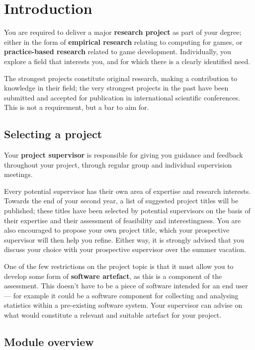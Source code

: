 \chapter{Introduction}

You are required to deliver a major \textbf{research project} as part of your degree;
either in the form of \textbf{empirical research} relating to computing for games,
or \textbf{practice-based research} related to game development.
Individually, you explore a field that interests you, and for which there is a clearly identified need.

The strongest projects constitute original research, making a contribution to knowledge in their field;
the very strongest projects in the past have been submitted and accepted for publication in international
scientific conferences. This is not a requirement, but a bar to aim for.

\section*{Selecting a project}

Your \textbf{project supervisor} is responsible for giving you guidance and feedback throughout your project,
through regular group and individual supervision meetings.

Every potential supervisor has their own area of expertise and research interests.
Towards the end of your second year, a list of suggested project titles will be published;
these titles have been selected by potential supervisors on the basis of their expertise
and their assessment of feasibility and interestingness.
You are also encouraged to propose your own project title,
which your prospective supervisor will then help you refine.
Either way, it is strongly advised that you discuss your choice with your prospective supervisor over the summer vacation.

One of the few restrictions on the project topic is that it must allow you to develop some form of \textbf{software artefact},
as this is a component of the assessment.
This doesn't have to be a piece of software intended for an end user ---
for example it could be a software component for collecting and analysing statistics within a pre-existing software system.
Your supervisor can advise on what would constitute a relevant and suitable artefact for your project.

\section*{Module overview}

